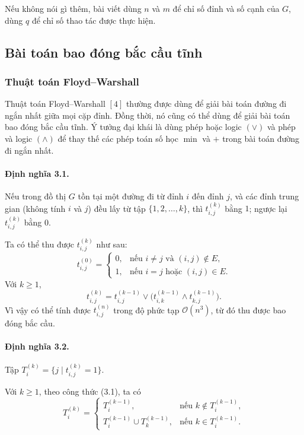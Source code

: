 \documentclass[11pt]{article}
\newcommand{\Oh}{\mathcal{O}}
\begin{document}
Nếu không nói gì thêm, bài viết dùng \(n\) và \(m\) để chỉ số đỉnh và số cạnh
của \(G\), dùng \(q\) để chỉ số thao tác được thực hiện.

\subsection{Bài toán bao đóng bắc cầu tĩnh}

\subsubsection{Thuật toán Floyd--Warshall}

Thuật toán Floyd--Warshall \([4]\) thường được dùng để giải bài toán đường đi
ngắn nhất giữa mọi cặp đỉnh. Đồng thời, nó cũng có thể dùng để giải bài toán
bao đóng bắc cầu tĩnh. Ý tưởng đại khái là dùng phép hoặc logic \((\vee)\) và
phép và logic \((\wedge)\) để thay thế các phép toán số học \(\min\) và \(+\)
trong bài toán đường đi ngắn nhất.

\paragraph{Định nghĩa 3.1.}
Nếu trong đồ thị \(G\) tồn tại một đường đi từ đỉnh \(i\) đến đỉnh \(j\), và
các đỉnh trung gian (không tính \(i\) và \(j\)) đều lấy từ tập
\(\{1,2,\ldots,k\}\), thì \(t_{i,j}^{(k)}\) bằng \(1\); ngược lại
\(t_{i,j}^{(k)}\) bằng \(0\).

Ta có thể thu được \(t_{i,j}^{(k)}\) như sau:
\[
  t_{i,j}^{(0)} =
  \begin{cases}
    0, & \text{nếu } i\ne j \text{ và } (i,j)\notin E,\\
    1, & \text{nếu } i=j \text{ hoặc } (i,j)\in E.
  \end{cases}
\]
Với \(k\ge 1\),
\[
  t_{i,j}^{(k)}
  = t_{i,j}^{(k-1)} \vee
    \bigl(t_{i,k}^{(k-1)}\wedge t_{k,j}^{(k-1)}\bigr).
  \tag{3.1}
\]
Vì vậy có thể tính được \(t_{i,j}^{(n)}\) trong độ phức tạp \(\Oh(n^3)\), từ
đó thu được bao đóng bắc cầu.

\paragraph{Định nghĩa 3.2.}
Tập \(T_i^{(k)}=\{j\mid t_{i,j}^{(k)}=1\}\).

Với \(k\ge 1\), theo công thức (3.1), ta có
\[
  T_i^{(k)} =
  \begin{cases}
    T_i^{(k-1)}, & \text{nếu } k\notin T_i^{(k-1)},\\
    T_i^{(k-1)}\cup T_k^{(k-1)}, & \text{nếu } k\in T_i^{(k-1)}.
  \end{cases}
\]
\end{document}
